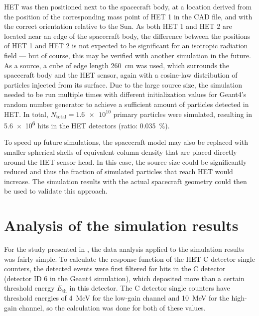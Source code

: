 \ac{HET} was then positioned next to the spacecraft body, at a location derived from the position of the corresponding mass point of \ac{HET} 1 in the \ac{CAD} file, and with the correct orientation relative to the Sun. As both \ac{HET} 1 and \ac{HET} 2 are located near an edge of the spacecraft body, the difference between the positions of \ac{HET} 1 and \ac{HET} 2 is not expected to be significant for an isotropic radiation field --- but of course, this may be verified with another simulation in the future. As a source, a cube of edge length \SI{260}{\centi\meter} was used, which surrounds the spacecraft body and the \ac{HET} sensor, again with a cosine-law distribution of particles injected from its surface. Due to the large source size, the simulation needed to be run multiple times with different initialization values for \ac{Geant4}'s random number generator to achieve a sufficient amount of particles detected in \ac{HET}. In total, $N_\text{total} = \num{1.6e10}$ primary particles were simulated, resulting in \num{5.6e6} hits in the \ac{HET} detectors (ratio: \SI{0.035}{\percent}).

To speed up future simulations, the spacecraft model may also be replaced with smaller spherical shells of equivalent column density that are placed directly around the \ac{HET} sensor head. In this case, the source size could be significantly reduced and thus the fraction of simulated particles that reach \ac{HET} would increase. The simulation results with the actual spacecraft geometry could then be used to validate this approach.

\section{Analysis of the simulation results}
\label{sec:het_sim_analysis}

For the study presented in \citet{Forstner-2021-SolO}, the data analysis applied to the simulation results was fairly simple. To calculate the response function of the \ac{HET} C detector single counters, the detected events were first filtered for hits in the C detector (detector ID 6 in the \ac{Geant4} simulation), which deposited more than a certain threshold energy $E_\text{th}$ in this detector. The C detector single counters have threshold energies of \SI{4}{\mega\electronvolt} for the low-gain channel and \SI{10}{\mega\electronvolt} for the high-gain channel, so the calculation was done for both of these values.

